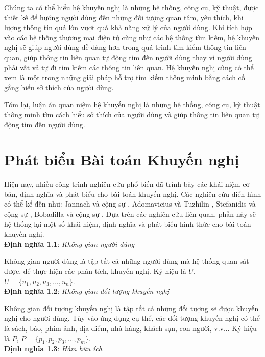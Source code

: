 Chúng ta có thể hiểu hệ khuyến nghị là những hệ thống, công cụ, kỹ thuật, được thiết kế để hướng người dùng đến những đối tượng quan tâm, yêu thích, khi lượng thông tin quá lớn vượt quá khả năng xử lý của người dùng. Khi tích hợp vào các hệ thống thương mại điện tử cũng như các hệ thống tìm kiếm, hệ khuyến nghị sẽ giúp người dùng dễ dàng hơn trong quá trình tìm kiếm thông tin liên quan, giúp thông tin liên quan tự động tìm đến người dùng thay vì người dùng phải vất vả tự đi tìm kiếm các thông tin liên quan. Hệ khuyến nghị cũng có thể xem là một trong những giải pháp hỗ trợ tìm kiếm thông minh bằng cách cố gắng hiểu sở thích của người dùng. 

Tóm lại, luận án quan niệm hệ khuyến nghị là những hệ thống, công cụ, kỹ thuật thông minh tìm cách hiểu sở thích của người dùng và giúp thông tin liên quan tự động tìm đến người dùng.

\section{Phát biểu Bài toán Khuyến nghị}
Hiện nay, nhiều công trình nghiên cứu phổ biến đã trình bày các khái niệm cơ bản, định nghĩa và phát biểu cho bài toán khuyến nghị. Các nghiên cứu điển hình có thể kể đến như: Jannach và cộng sự \cite{Jannach:2010:RSI}, Adomavicius và Tuzhilin \cite{Adomavicius:2005:TNG:1070611.1070751}, Stefanidis và cộng sự \cite{StefanidisNNK12}, Bobadilla và cộng sự \cite{Bobadilla2013109}. Dựa trên các nghiên cứu liên quan, phần này sẽ hệ thống lại một số khái niệm, định nghĩa và phát biểu hình thức cho bài toán khuyến nghị.\\
\textbf{Định nghĩa 1.1}: \textit{Không gian người dùng} \cite{Jannach:2010:RSI}

Không gian người dùng là tập tất cả những người dùng mà hệ thống quan sát được, để thực hiện các phân tích, khuyến nghị. Ký hiệu là $U$, $U = \{u_{1}, u_{2}, u_{3}, ..., u_{n}\}$. \\
\textbf{Định nghĩa 1.2}: \textit{Không gian đối tượng khuyến nghị} \cite{Jannach:2010:RSI}

Không gian đối tượng khuyến nghị là tập tất cả những đối tượng sẽ được khuyến nghị cho người dùng. Tùy vào ứng dụng cụ thể, các đối tượng khuyến nghị có thể là sách, báo, phim ảnh, địa điểm, nhà hàng, khách sạn, con người, v.v... Ký hiệu là $P$, $P = \{p_{1}, p_{2}, p_{3}, ..., p_{m}\}$.\\
%
\textbf{Định nghĩa 1.3}: \textit{Hàm hữu ích} \cite{Adomavicius:2005:TNG:1070611.1070751}

